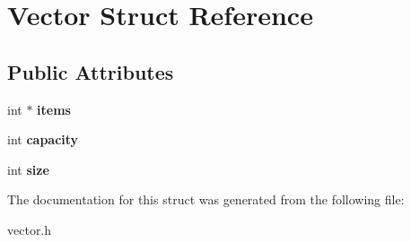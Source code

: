 \hypertarget{structVector}{}\section{Vector Struct Reference}
\label{structVector}
\subsection*{Public Attributes}
\begin{DoxyCompactItemize}
\item 
\mbox{\label{structVector_ae543ea4cf854da976f8627018b8eebf2}} 
int $\ast$ {\bfseries items}
\item 
\mbox{\label{structVector_a6d49b240ab4a8ccb9b1c7297e78511da}} 
int {\bfseries capacity}
\item 
\mbox{\label{structVector_ae13c6e730a6558ba444beb8f7e44d4ca}} 
int {\bfseries size}
\end{DoxyCompactItemize}


The documentation for this struct was generated from the following file\+:\begin{DoxyCompactItemize}
\item 
vector.\+h\end{DoxyCompactItemize}
